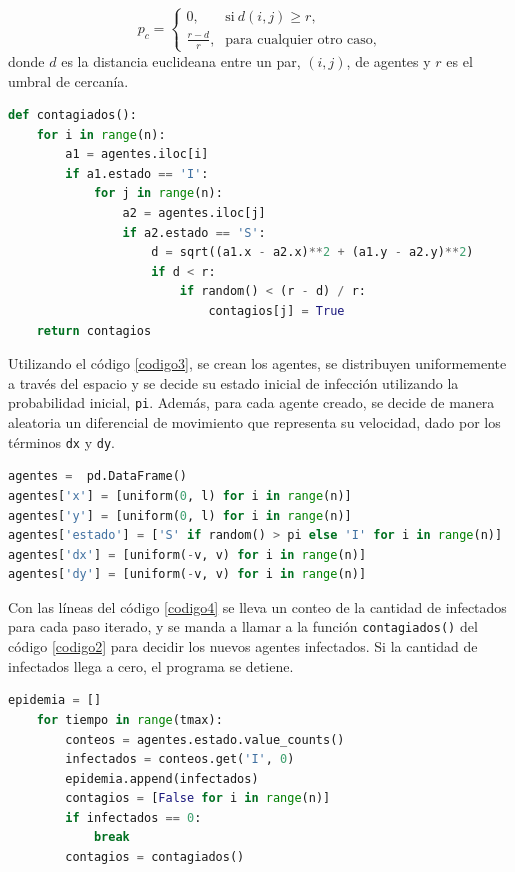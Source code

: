 \documentclass{article}
\begin{document}
\begin{equation}\label{eq1}
    p_c =
    \begin{cases}
    0\text{,} & \text{si} \ d(i,j) \geq r\text{,}\\
    \frac{r-d}{r}\text{,} & \text{para cualquier otro caso,}
    \end{cases}
\end{equation}
donde $d$ es la distancia euclideana entre un par, $(i,j)$, de agentes y $r$ es el umbral de cercan\'ia.

\begin{lstlisting}[caption=Nuevos Agentes Infectados, label=codigo2, language=Python]
def contagiados():
    for i in range(n):
        a1 = agentes.iloc[i]
        if a1.estado == 'I':
            for j in range(n):
                a2 = agentes.iloc[j]
                if a2.estado == 'S':
                    d = sqrt((a1.x - a2.x)**2 + (a1.y - a2.y)**2)
                    if d < r:
                        if random() < (r - d) / r:
                            contagios[j] = True
    return contagios
\end{lstlisting}

Utilizando el c\'odigo \ref{codigo3}, se crean los agentes, se distribuyen uniformemente a trav\'es del espacio y se decide su estado inicial de infecci\'on utilizando la probabilidad inicial, \texttt{pi}. Adem\'as, para cada agente creado, se decide de manera aleatoria un diferencial de movimiento que representa su velocidad, dado por los t\'erminos \texttt{dx} y \texttt{dy}.

\begin{lstlisting}[caption=Creaci\'on de Agentes, label=codigo3, language=Python]
agentes =  pd.DataFrame()
agentes['x'] = [uniform(0, l) for i in range(n)]
agentes['y'] = [uniform(0, l) for i in range(n)]
agentes['estado'] = ['S' if random() > pi else 'I' for i in range(n)]
agentes['dx'] = [uniform(-v, v) for i in range(n)]
agentes['dy'] = [uniform(-v, v) for i in range(n)]
\end{lstlisting}

Con las l\'ineas del c\'odigo \ref{codigo4} se lleva un conteo de la cantidad de infectados para cada paso iterado, y se manda a llamar a la funci\'on \texttt{contagiados()} del c\'odigo \ref{codigo2} para decidir los nuevos agentes infectados. Si la cantidad de infectados llega a cero, el programa se detiene.

\begin{lstlisting}[caption=Conteo de Infectados, label=codigo4, language=Python]
epidemia = []
    for tiempo in range(tmax):
        conteos = agentes.estado.value_counts()
        infectados = conteos.get('I', 0)
        epidemia.append(infectados)
        contagios = [False for i in range(n)]
        if infectados == 0:
            break
        contagios = contagiados()
\end{lstlisting}
\end{document}
